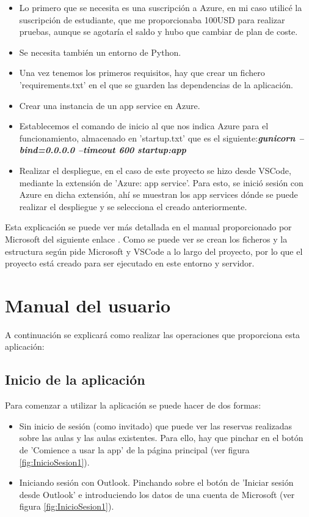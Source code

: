 \begin{itemize}
    \item Lo primero que se necesita es una suscripción a Azure, en mi caso utilicé la suscripción de estudiante, que me proporcionaba 100USD para realizar pruebas, aunque se agotaría el saldo y hubo que cambiar de plan de coste.
    \item Se necesita también un entorno de Python.
    \item Una vez tenemos los primeros requisitos, hay que crear un fichero 'requirements.txt' en el que se guarden las dependencias de la aplicación.
    \item Crear una instancia de un app service en Azure.
    \item Establecemos el comando de inicio al que nos indica Azure para el funcionamiento, almacenado en 'startup.txt' que es el siguiente:\newline \textit{\textbf{gunicorn --bind=0.0.0.0 --timeout 600 startup:app}}
    \item Realizar el despliegue, en el caso de este proyecto se hizo desde VSCode, mediante la extensión de 'Azure: app service'. Para esto, se inició sesión con Azure en dicha extensión, ahí se muestran los app services dónde se puede realizar el despliegue y se selecciona el creado anteriormente.
\end{itemize}
Esta explicación se puede ver más detallada en el manual proporcionado por Microsoft del siguiente enlace \cite{deployVSCode}.\newline
Como se puede ver se crean los ficheros y la estructura según pide Microsoft y VSCode a lo largo del proyecto, por lo que el proyecto está creado para ser ejecutado en este entorno y servidor.


\section{Manual del usuario}
A continuación se explicará como realizar las operaciones que proporciona esta aplicación:
\subsection{Inicio de la aplicación}
Para comenzar a utilizar la aplicación se puede hacer de dos formas:
\begin{itemize}
    \item Sin inicio de sesión (como invitado) que puede ver las reservas realizadas sobre las aulas y las aulas existentes. Para ello, hay que pinchar en el botón de 'Comience a usar la app' de la página principal (ver figura \ref{fig:InicioSesion1}).
    \item Iniciando sesión con Outlook. Pinchando sobre el botón de 'Iniciar sesión desde Outlook' e introduciendo los datos de una cuenta de Microsoft (ver figura \ref{fig:InicioSesion1}).
\end{itemize}
